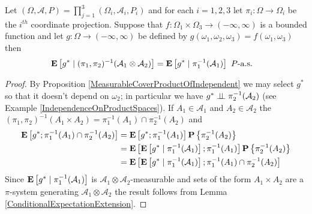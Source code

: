 \begin{lem}Let $(\Omega, \mathcal{A}, P) = \prod_{j=1}^3 (\Omega_i, \mathcal{A}_i, P_i)$ and for each $i=1,2,3$ let $\pi_i : \Omega \to \Omega_i$ be the $i^{th}$ coordinate projection.  Suppose that $f : \Omega_1 \times \Omega_3 \to (-\infty, \infty)$ is a bounded function and let $g : \Omega \to (-\infty, \infty)$ be defined by $g(\omega_1,\omega_2,\omega_3) = f(\omega_1, \omega_3)$ then 
\begin{align*}
\cexpectationlong{(\pi_1, \pi_2)^{-1} (\mathcal{A}_1 \otimes \mathcal{A}_2)}{g^*} &= \cexpectationlong{\pi_1^{-1} (\mathcal{A}_1)}{g^*} \text{ $P$-a.s.}
\end{align*}
\end{lem}
\begin{proof}
By Proposition \ref{MeasurableCoverProductOfIndependent} we may select $g^*$ so that it doesn't depend on $\omega_2$; in particular we have $g^* \Independent \pi_2^{-1}(\mathcal{A}_2)$ (see Example \ref{IndependenceOnProductSpaces}).  If $A_1 \in \mathcal{A}_1$ and $A_2 \in \mathcal{A}_2$ the
$(\pi_1, \pi_2)^{-1}(A_1 \times A_2) = \pi_1^{-1}(A_1) \cap \pi_2^{-1}(A_2)$ and 
\begin{align*}
\expectation{ g^* ; \pi_1^{-1}(A_1) \cap \pi_2^{-1}(A_2)} &= \expectation{ g^* ; \pi_1^{-1}(A_1)} \probability{ \pi_2^{-1}(A_2)}  \\
&=\expectation{ \cexpectationlong{\pi_1^{-1}(\mathcal{A}_1)}{g^*} ; \pi_1^{-1}(A_1)} \probability{ \pi_2^{-1}(A_2)} \\
&=\expectation{ \cexpectationlong{\pi_1^{-1}(\mathcal{A}_1)}{g^*} ; \pi_1^{-1}(A_1) \cap \pi_2^{-1}(A_2)} 
\end{align*}
Since $\cexpectationlong{\pi_1^{-1}(\mathcal{A}_1)}{g^*}$ is $\mathcal{A}_1 \otimes \mathcal{A}_2$-measurable and sets of the form $A_1 \times A_2$ are a $\pi$-system generating $\mathcal{A}_1 \otimes \mathcal{A}_2$ the result follows from Lemma \ref{ConditionalExpectationExtension}.
\end{proof}

